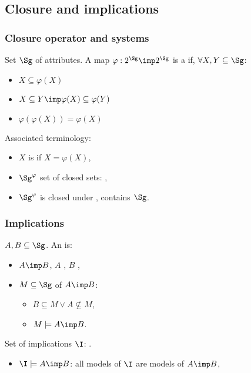

\subsection{Closure and implications}

\begin{frame}
\frametitle{Closure operator and systems}

Set $\Sg$ of attributes. A map $\varphi: 2^{\Sg} \imp 2^{\Sg}$ is a 
 if, $\forall X, Y \subseteq \Sg$:
\begin{itemize}
	\item $X \subseteq \varphi(X)$ \quad {}
	\item $X \subseteq Y \imp \varphi(X) \subseteq \varphi(Y)$ 
	\quad {}
	\item $\varphi(\varphi(X)) = \varphi(X)$ \quad {}
\end{itemize}

\vspace{1.2em}

Associated terminology:
\begin{itemize}
	\item $X$ is  if $X = \varphi(X)$,
	\item $\Sg^\varphi$ set of closed sets: ,
	\item $\Sg^\varphi$ is closed under , contains $\Sg$.
\end{itemize}

\end{frame}


\begin{frame}
\frametitle{Implications}

$A, B \subseteq \Sg$. An  is:
\begin{itemize}
	\item $A \imp B$, $A$ , $B$ ,
	\item $M \subseteq \Sg$  of $A \imp B$:
		\begin{itemize}
			\item[\belemp{$\triangleright$}] $B \subseteq M \lor A \nsubseteq M$, \quad {}
			\item[\belemp{$\triangleright$}] $M \models A \imp B$.
		\end{itemize}

\end{itemize}

\vspace{1.2em}

Set of implications $\I$: .
\begin{itemize}
	\item $\I \models A \imp B$: all models of $\I$ are models of $A \imp B$,
\end{itemize}

\end{frame}


